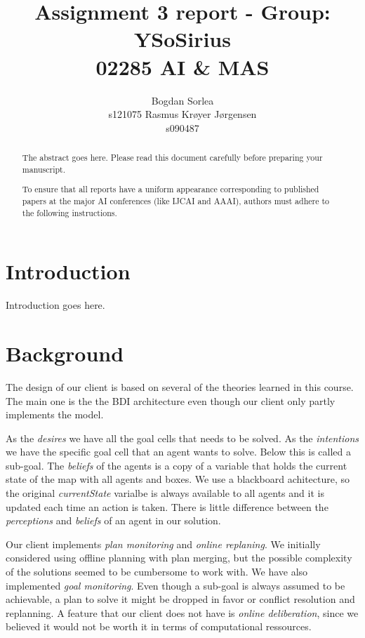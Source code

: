 \documentclass[letterpaper]{article}
\begin{document}
\title{Assignment 3 report - Group: YSoSirius \\ 02285 AI \& MAS}
\author{Bogdan Sorlea \\ s121075 \And Rasmus Kr{\o}yer J{\o}rgensen \\ s090487}
\maketitle
\begin{abstract}
The abstract goes here. Please read this document carefully before preparing your manuscript.

To ensure that all reports have a uniform appearance corresponding to published papers at the major AI conferences (like IJCAI and AAAI), authors must adhere to the following instructions. 
\end{abstract}

\section{Introduction}
Introduction goes here.

\section{Background}
The design of our client is based on several of the theories learned in this course. The main one is the the BDI architecture even though our client only partly implements the model. 

As the \textit{desires} we have all the goal cells that needs to be solved. As the \textit{intentions} we have the specific goal cell that an agent wants to solve. Below this is called a sub-goal. The \textit{beliefs} of the agents is a copy of a variable that holds the current state of the map with all agents and boxes. We use a blackboard achitecture, so the original \textit{currentState} varialbe is always available to all agents and it is updated each time an action is taken. There is little difference between the \textit{perceptions} and \textit{beliefs} of an agent in our solution.

Our client implements \textit{plan monitoring} and \textit{online replaning}. We initially considered using offline planning with plan merging, but the possible complexity of the solutions seemed to be cumbersome to work with. We have also implemented \textit{goal monitoring}. Even though a sub-goal is always assumed to be achievable, a plan to solve it might be dropped in favor or conflict resolution and replanning. A feature that our client does not have is \textit{online deliberation}, since we believed it would not be worth it in terms of computational ressources. 
\end{document}
